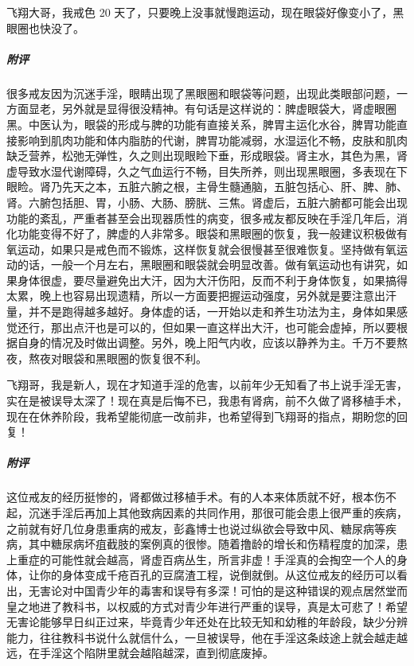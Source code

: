 \begin{case}
    飞翔大哥，我戒色 20 天了，只要晚上没事就慢跑运动，现在眼袋好像变小了，黑眼圈也快没了。
    \subparagraph{附评} 很多戒友因为沉迷手淫，眼睛出现了黑眼圈和眼袋等问题，出现此类眼部问题，一方面显老，另外就是显得很没精神。有句话是这样说的：脾虚眼袋大，肾虚眼圈黑。中医认为，眼袋的形成与脾的功能有直接关系，脾胃主运化水谷，脾胃功能直接影响到肌肉功能和体内脂肪的代谢，脾胃功能减弱，水湿运化不畅，皮肤和肌肉缺乏营养，松弛无弹性，久之则出现眼睑下垂，形成眼袋。肾主水，其色为黑，肾虚导致水湿代谢障碍，久之气血运行不畅，目失所养，则出现黑眼圈，多表现在下眼睑。肾乃先天之本，五脏六腑之根，主骨生髓通脑，五脏包括心、肝、脾、肺、肾。六腑包括胆、胃，小肠、大肠、膀胱、三焦。肾虚后，五脏六腑都可能会出现功能的紊乱，严重者甚至会出现器质性的病变，很多戒友都反映在手淫几年后，消化功能变得不好了，脾虚的人非常多。眼袋和黑眼圈的恢复，我一般建议积极做有氧运动，如果只是戒色而不锻炼，这样恢复就会很慢甚至很难恢复。坚持做有氧运动的话，一般一个月左右，黑眼圈和眼袋就会明显改善。做有氧运动也有讲究，如果身体很虚，要尽量避免出大汗，因为大汗伤阳，反而不利于身体恢复，如果搞得太累，晚上也容易出现遗精，所以一方面要把握运动强度，另外就是要注意出汗量，并不是跑得越多越好。身体虚的话，一开始以走和养生功法为主，身体如果感觉还行，那出点汗也是可以的，但如果一直这样出大汗，也可能会虚掉，所以要根据自身的情况及时做出调整。另外，晚上阳气内收，应该以静养为主。千万不要熬夜，熬夜对眼袋和黑眼圈的恢复很不利。
\end{case}

\begin{case}
    飞翔哥，我是新人，现在才知道手淫的危害，以前年少无知看了书上说手淫无害，实在是被误导太深了！现在真是后悔不已，我患有肾病，前不久做了肾移植手术，现在在休养阶段，我希望能彻底一改前非，也希望得到飞翔哥的指点，期盼您的回复！
    \subparagraph{附评} 这位戒友的经历挺惨的，肾都做过移植手术。有的人本来体质就不好，根本伤不起，沉迷手淫后再加上其他致病因素的共同作用，那很可能会患上很严重的疾病，之前就有好几位身患重病的戒友，彭鑫博士也说过纵欲会导致中风、糖尿病等疾病，其中糖尿病坏疽截肢的案例真的很惨。随着撸龄的增长和伤精程度的加深，患上重症的可能性就会越高，肾虚百病丛生，所言非虚！手淫真的会掏空一个人的身体，让你的身体变成千疮百孔的豆腐渣工程，说倒就倒。从这位戒友的经历可以看出，无害论对中国青少年的毒害和误导有多深！可怕的是这种错误的观点居然堂而皇之地进了教科书，以权威的方式对青少年进行严重的误导，真是太可悲了！希望无害论能够早日纠正过来，毕竟青少年还处在比较无知和幼稚的年龄段，缺少分辨能力，往往教科书说什么就信什么，一旦被误导，他在手淫这条歧途上就会越走越远，在手淫这个陷阱里就会越陷越深，直到彻底废掉。
\end{case}


